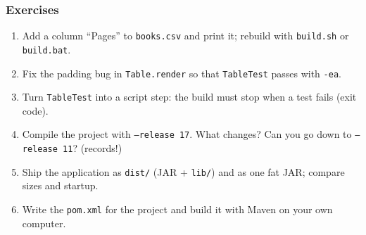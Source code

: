 \documentclass[aspectratio=169,10pt,compress]{beamer}
\begin{document}
\begin{frame}[t,fragile] \frametitle{Exercises}
  \begin{enumerate}\small
    \item Add a column ``Pages'' to \texttt{books.csv} and print it; rebuild with \texttt{build.sh} or \texttt{build.bat}.
    \item Fix the padding bug in \texttt{Table.render} so that \texttt{TableTest} passes with \texttt{-ea}.
    \item Turn \texttt{TableTest} into a script step: the build must stop when a test fails (exit code).
    \item Compile the project with \texttt{--release 17}. What changes? Can you go down to \texttt{--release 11}? (records!)
    \item Ship the application as \texttt{dist/} (JAR + \texttt{lib/}) and as one fat JAR; compare sizes and startup.
    \item Write the \texttt{pom.xml} for the project and build it with Maven on your own computer.
  \end{enumerate}
\end{frame}




\begin{frame}[t,fragile]
	\begin{center}
		\vspace{4cm}
	\end{center}
\end{frame}
\end{document}

